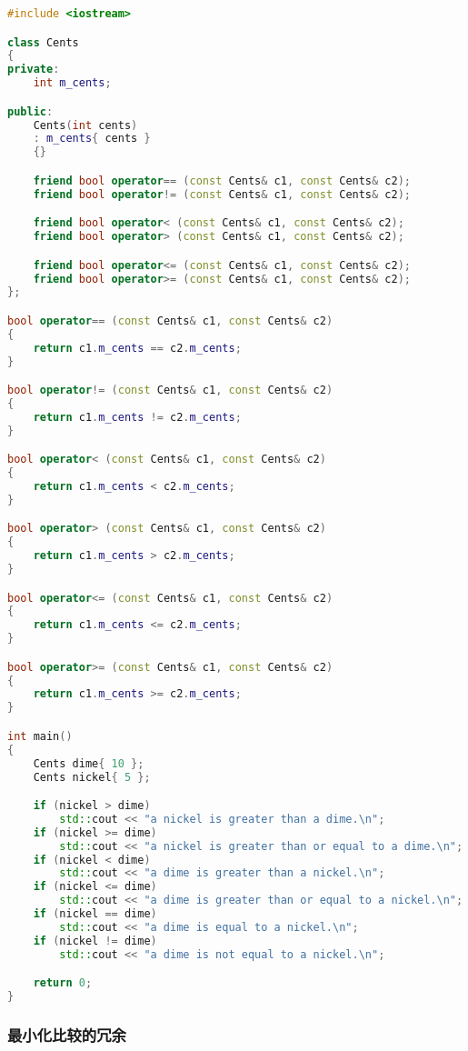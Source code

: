 \documentclass[../../LearnCpp.tex]{subfiles}
\begin{document}
\begin{lstlisting}[language=C++]
#include <iostream>

class Cents
{
private:
    int m_cents;

public:
    Cents(int cents)
	: m_cents{ cents }
	{}

    friend bool operator== (const Cents& c1, const Cents& c2);
    friend bool operator!= (const Cents& c1, const Cents& c2);

    friend bool operator< (const Cents& c1, const Cents& c2);
    friend bool operator> (const Cents& c1, const Cents& c2);

    friend bool operator<= (const Cents& c1, const Cents& c2);
    friend bool operator>= (const Cents& c1, const Cents& c2);
};

bool operator== (const Cents& c1, const Cents& c2)
{
    return c1.m_cents == c2.m_cents;
}

bool operator!= (const Cents& c1, const Cents& c2)
{
    return c1.m_cents != c2.m_cents;
}

bool operator< (const Cents& c1, const Cents& c2)
{
    return c1.m_cents < c2.m_cents;
}

bool operator> (const Cents& c1, const Cents& c2)
{
    return c1.m_cents > c2.m_cents;
}

bool operator<= (const Cents& c1, const Cents& c2)
{
    return c1.m_cents <= c2.m_cents;
}

bool operator>= (const Cents& c1, const Cents& c2)
{
    return c1.m_cents >= c2.m_cents;
}

int main()
{
    Cents dime{ 10 };
    Cents nickel{ 5 };

    if (nickel > dime)
        std::cout << "a nickel is greater than a dime.\n";
    if (nickel >= dime)
        std::cout << "a nickel is greater than or equal to a dime.\n";
    if (nickel < dime)
        std::cout << "a dime is greater than a nickel.\n";
    if (nickel <= dime)
        std::cout << "a dime is greater than or equal to a nickel.\n";
    if (nickel == dime)
        std::cout << "a dime is equal to a nickel.\n";
    if (nickel != dime)
        std::cout << "a dime is not equal to a nickel.\n";

    return 0;
}
\end{lstlisting}

\subsubsection*{最小化比较的冗余}
\end{document}
